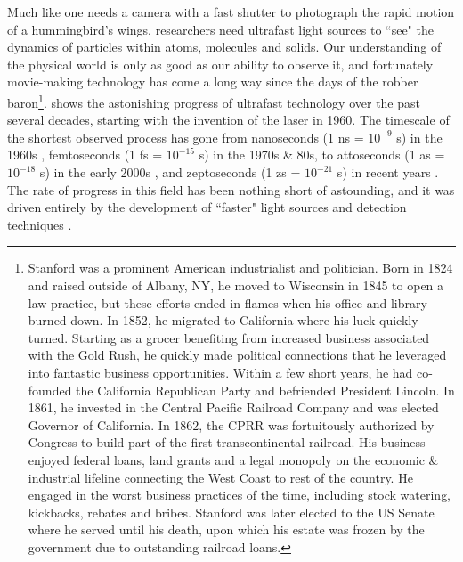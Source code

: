 Much like one needs a camera with a fast shutter to photograph the rapid motion of a hummingbird's wings, researchers need ultrafast light sources to ``see" the dynamics of particles within atoms, molecules and solids. Our understanding of the physical world is only as good as our ability to observe it, and fortunately movie-making technology has come a long way since the days of the robber baron\footnote{Stanford was a prominent American industrialist and politician. Born in 1824 and raised outside of Albany, NY, he moved to Wisconsin in 1845 to open a law practice, but these efforts ended in flames when his office and library burned down. In 1852, he migrated to California where his luck quickly turned. Starting as a grocer benefiting from increased business associated with the Gold Rush, he quickly made political connections that he leveraged into fantastic business opportunities. Within a few short years, he had co-founded the California Republican Party and befriended President Lincoln. In 1861, he invested in the Central Pacific Railroad Company and was elected Governor of California. In 1862, the CPRR was fortuitously authorized by Congress to build part of the first transcontinental railroad. His business enjoyed federal loans, land grants and a legal monopoly on the economic \& industrial lifeline connecting the West Coast to rest of the country. He engaged in the worst business practices of the time, including stock watering, kickbacks, rebates and bribes. Stanford was later elected to the US Senate where he served until his death, upon which his estate was frozen by the government due to outstanding railroad loans.}.  shows the astonishing progress of ultrafast technology over the past several decades, starting with the invention of the laser in 1960. The timescale of the shortest observed process has gone from nanoseconds ({1 ns = $10^{-9}$ s}) in the 1960s \cite{krauszAttosecondMetrologyElectron2014}, femtoseconds ({1 fs = $10^{-15}$ s}) in the 1970s \& 80s, to attoseconds ({1 as = $10^{-18}$ s}) in the early 2000s \cite{hentschelAttosecondMetrology2001,krauszFemtochemistryAttophysics2001}, and zeptoseconds ({1 zs = $10^{-21}$ s}) in recent years \cite{ossianderAttosecondCorrelationDynamics2017,grundmannZeptosecondBirthTime2020}. The rate of progress in this field has been nothing short of astounding, and it was driven entirely by the development of ``faster" light sources and detection techniques \cite{kartnerFemtosecondLaserDevelopment2005}.


